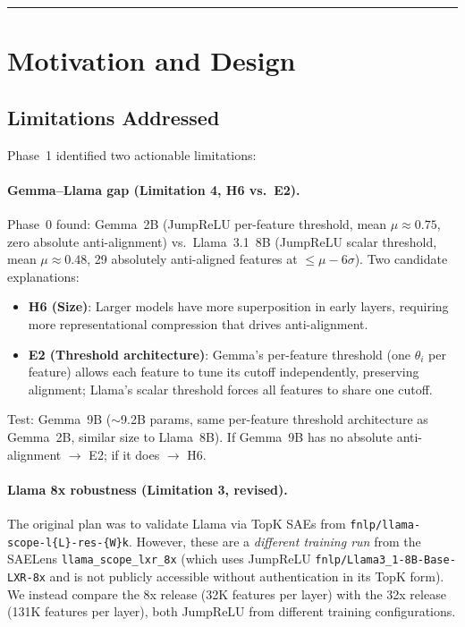 \documentclass[11pt,a4paper]{article}
\begin{document}
\vspace{0.5em}\hrule\vspace{0.5em}
\tableofcontents\newpage

\section{Motivation and Design}

\subsection{Limitations Addressed}

Phase~1 identified two actionable limitations:

\paragraph{Gemma--Llama gap (Limitation 4, H6 vs.\ E2).} Phase~0 found: Gemma~2B (JumpReLU per-feature threshold, mean $\mu \approx 0.75$, zero absolute anti-alignment) vs.\ Llama~3.1~8B (JumpReLU scalar threshold, mean $\mu \approx 0.48$, 29 absolutely anti-aligned features at $\leq\mu-6\sigma$). Two candidate explanations:
\begin{itemize}[nosep]
  \item \textbf{H6 (Size)}: Larger models have more superposition in early layers, requiring more representational compression that drives anti-alignment.
  \item \textbf{E2 (Threshold architecture)}: Gemma's per-feature threshold (one $\theta_i$ per feature) allows each feature to tune its cutoff independently, preserving alignment; Llama's scalar threshold forces all features to share one cutoff.
\end{itemize}
Test: Gemma~9B ($\sim$9.2B params, same per-feature threshold architecture as Gemma~2B, similar size to Llama~8B). If Gemma~9B has no absolute anti-alignment $\to$ E2; if it does $\to$ H6.

\paragraph{Llama 8x robustness (Limitation 3, revised).} The original plan was to validate Llama via TopK SAEs from \texttt{fnlp/llama-scope-l\{L\}-res-\{W\}k}. However, these are a \emph{different training run} from the SAELens \texttt{llama\_scope\_lxr\_8x} (which uses JumpReLU \texttt{fnlp/Llama3\allowbreak{}\_1-8B-Base-LXR-8x} and is not publicly accessible without authentication in its TopK form). We instead compare the 8x release (32K features per layer) with the 32x release (131K features per layer), both JumpReLU from different training configurations.
\end{document}
